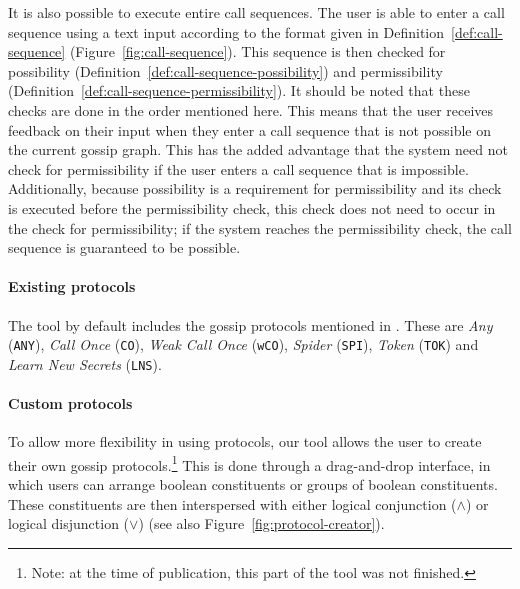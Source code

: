 It is also possible to execute entire call sequences.
The user is able to enter a call sequence using a text input according to the format given in Definition~\ref{def:call-sequence} (Figure~\ref{fig:call-sequence}).
This sequence is then checked for possibility (Definition~\ref{def:call-sequence-possibility}) and permissibility (Definition~\ref{def:call-sequence-permissibility}).
It should be noted that these checks are done in the order mentioned here.
This means that the user receives feedback on their input when they enter a call sequence that is not possible on the current gossip graph.
This has the added advantage that the system need not check for permissibility if the user enters a call sequence that is impossible.
Additionally, because possibility is a requirement for permissibility and its check is executed before the permissibility check, this check does not need to occur in the check for permissibility;
if the system reaches the permissibility check, the call sequence is guaranteed to be possible.

\paragraph{Existing protocols}
\label{sec:existing-protocols}

The tool by default includes the gossip protocols mentioned in \textcite{van_ditmarsch_dynamic_2018}.
These are \emph{Any} (\texttt{ANY}), \emph{Call Once} (\texttt{CO}), \emph{Weak Call Once} (\texttt{wCO}), \emph{Spider} (\texttt{SPI}), \emph{Token} (\texttt{TOK}) and \emph{Learn New Secrets} (\texttt{LNS}).

\paragraph{Custom protocols}
\label{sec:custom-protocols}

To allow more flexibility in using protocols, 
our tool allows the user to create their own gossip protocols.\footnote{Note: at the time of publication, this part of the tool was not finished.}
This is done through a drag-and-drop interface,
in which users can arrange boolean constituents or groups of boolean constituents.
These constituents are then interspersed with either logical conjunction (\(\land\)) or logical disjunction (\(\lor\)) (see also Figure~\ref{fig:protocol-creator}).

